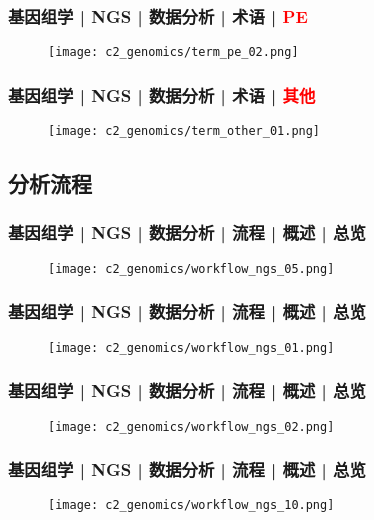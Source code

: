 \begin{frame}
  \frametitle{基因组学 | NGS | 数据分析 | 术语 | \textcolor{red}{PE}}
  \begin{figure}
    \centering
    \texttt{[image: c2\_genomics/term\_pe\_02.png]}
  \end{figure}
\end{frame}

\begin{frame}
  \frametitle{基因组学 | NGS | 数据分析 | 术语 | \textcolor{red}{其他}}
  \begin{figure}
    \centering
    \texttt{[image: c2\_genomics/term\_other\_01.png]}
  \end{figure}
\end{frame}

\subsection{分析流程}
\begin{frame}
  \frametitle{基因组学 | NGS | 数据分析 | 流程 | 概述 | 总览}
  \begin{figure}
    \centering
    \texttt{[image: c2\_genomics/workflow\_ngs\_05.png]}
  \end{figure}
\end{frame}

\begin{frame}
  \frametitle{基因组学 | NGS | 数据分析 | 流程 | 概述 | 总览}
  \begin{figure}
    \centering
    \texttt{[image: c2\_genomics/workflow\_ngs\_01.png]}
  \end{figure}
\end{frame}

\begin{frame}
  \frametitle{基因组学 | NGS | 数据分析 | 流程 | 概述 | 总览}
  \begin{figure}
    \centering
    \texttt{[image: c2\_genomics/workflow\_ngs\_02.png]}
  \end{figure}
\end{frame}

\begin{frame}
  \frametitle{基因组学 | NGS | 数据分析 | 流程 | 概述 | 总览}
  \begin{figure}
    \centering
    \texttt{[image: c2\_genomics/workflow\_ngs\_10.png]}
  \end{figure}
\end{frame}

